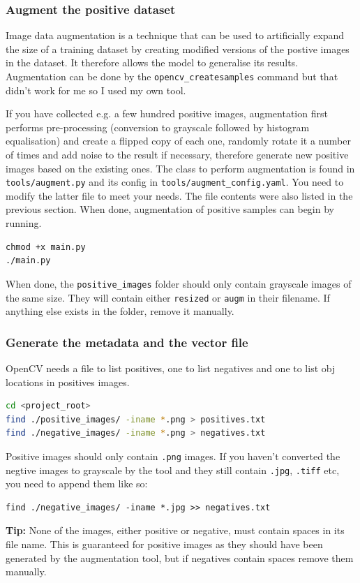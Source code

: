 \documentclass[a4paper]{article}
\begin{document}
\subsubsection{Augment the positive dataset}

Image data augmentation is a technique that can be used to artificially expand the size of a training dataset by creating modified versions of the postive images in the dataset. It therefore allows the model to generalise its results. Augmentation can be done by the \texttt{opencv\_createsamples} command but that didn't work for me so I used my own tool.

If you have collected e.g. a few hundred positive images, augmentation first performs pre-processing (conversion to grayscale followed by histogram equalisation) and create a flipped copy of each one, randomly rotate it a number of times and add noise to the result if necessary, therefore generate new positive images based on the existing ones. The class to perform augmentation is found in \texttt{tools/augment.py} and its config in \texttt{tools/augment\_config.yaml}. You need to modify the latter file to meet your needs. The file contents were also listed in the previous section. When done, augmentation of positive samples can begin by running.
\begin{lstlisting}[style=terminal]
chmod +x main.py
./main.py
\end{lstlisting}
When done, the \texttt{positive\_images} folder should only contain grayscale images of the same size. They will contain either \texttt{resized} or \texttt{augm} in their filename. If anything else exists in the folder, remove it manually.



\subsubsection{Generate the metadata and the vector file}

OpenCV needs a file to list positives, one to list negatives and one to list obj locations in positives images.
\begin{lstlisting}[style=terminal,language=bash]
cd <project_root>
find ./positive_images/ -iname *.png > positives.txt
find ./negative_images/ -iname *.png > negatives.txt
\end{lstlisting}
Positive images should only contain \texttt{.png} images. If you haven't converted the negtive images to grayscale by the tool and they still contain \texttt{.jpg}, \texttt{.tiff} etc, you need to append them like so:
\begin{lstlisting}[style=terminal]
find ./negative_images/ -iname *.jpg >> negatives.txt
\end{lstlisting}
\textbf{Tip:} None of the images, either positive or negative, must contain spaces in its file name. This is guaranteed for positive images as they should have been generated by the augmentation tool, but if negatives contain spaces remove them manually.
\end{document}
